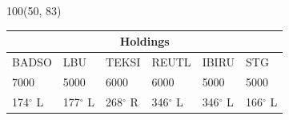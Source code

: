 \documentclass[10pt,landscape,a4paper]{article}
\begin{document}
\begin{textblock}{100}(50, 83)
\begin{table}[]
\begin{tabular}{llllll} 
\multicolumn{6}{c}{\textbf{Holdings}}                                                                                                                                        \\ \hline
\multicolumn{1}{|l|}{BADSO} & 
\multicolumn{1}{l|}{LBU}   & 
\multicolumn{1}{l|}{TEKSI} & 
\multicolumn{1}{l|}{REUTL} &
\multicolumn{1}{l|}{IBIRU} &
\multicolumn{1}{l|}{STG} \\ \hline
\multicolumn{1}{|l|}{7000} & 
\multicolumn{1}{l|}{5000} & 
\multicolumn{1}{l|}{6000} & 
\multicolumn{1}{l|}{6000} &
\multicolumn{1}{l|}{5000} &
\multicolumn{1}{l|}{5000} \\
\multicolumn{1}{|l|}{174$^\circ$ L} & 
\multicolumn{1}{l|}{177$^\circ$ L} & 
\multicolumn{1}{l|}{268$^\circ$ R} & 
\multicolumn{1}{l|}{346$^\circ$ L} &
\multicolumn{1}{l|}{346$^\circ$ L} &
\multicolumn{1}{l|}{166$^\circ$ L} \\ \hline
\end{tabular}
\end{table}
\end{textblock}
\end{document}
